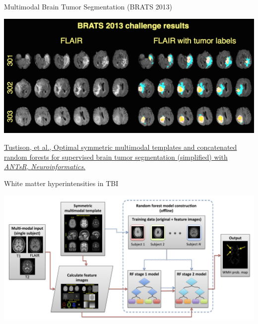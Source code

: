 \documentclass[ignorenonframetext,]{beamer}
\begin{document}
\begin{frame}{Multimodal Brain Tumor Segmentation (BRATS 2013)}

\includegraphics{./competitions/figures/brats2013results1.png}

\href{http://www.ncbi.nlm.nih.gov/pubmed/25433513}{Tustison, et al.,
Optimal symmetric multimodal templates and concatenated random forests
for supervised brain tumor segmentation (simplified) with \emph{ANTsR},
\emph{Neuroinformatics}.}

\end{frame}

\begin{frame}{White matter hyperintensities in TBI}

\includegraphics{./wmhs/figures/wmhPipeline.png}

\end{frame}
\end{document}
